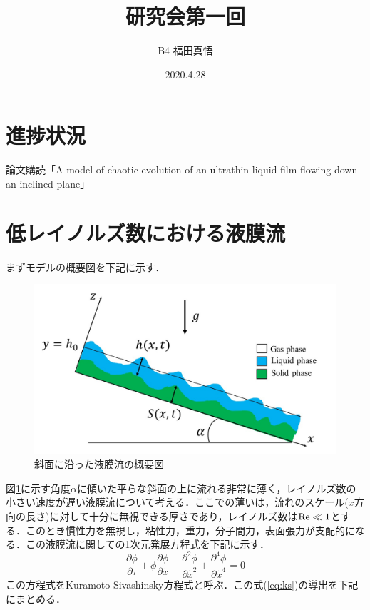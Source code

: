 \documentclass[autodetect-engine,dvipdfmx-if-dvi,ja=standard,a4paper,11pt]{bxjsarticle} %
\title{研究会第一回} %
\author{B4 福田真悟} %
\date{2020.4.28}%
\begin{document}
\maketitle %
\section{進捗状況}%
論文購読「A model of chaotic evolution of an ultrathin liquid film flowing down an inclined plane」
\section{低レイノルズ数における液膜流}
まずモデルの概要図を下記に示す．
\begin{figure}[H]%
\begin{center}
\includegraphics[width=.6\textwidth]{aboutNEW.jpg} 
\end{center}
\caption{斜面に沿った液膜流の概要図}%
\label{fig:about}%
\end{figure}
図\ref{fig:about}に示す角度$\alpha$に傾いた平らな斜面の上に流れる非常に薄く，レイノルズ数の小さい速度が遅い液膜流について考える．ここでの薄いは，流れのスケール($x$方向の長さ)に対して十分に無視できる厚さであり，レイノルズ数は${\rm Re}\ll1$とする．このとき慣性力を無視し，粘性力，重力，分子間力，表面張力が支配的になる．この液膜流に関しての1次元発展方程式を下記に示す．
\begin{equation}
\frac{\partial\phi}{\partial\tau}+\phi\frac{\partial\phi}{\partial\tilde{x}}+\frac{\partial^2\phi}{\partial\tilde{x}^2}+\frac{\partial^4\phi}{\partial\tilde{x}^4}=0
\label{eq:ks}
\end{equation}
この方程式をKuramoto-Sivashinsky方程式と呼ぶ．この式(\ref{eq:ks})の導出を下記にまとめる．
\end{document}
